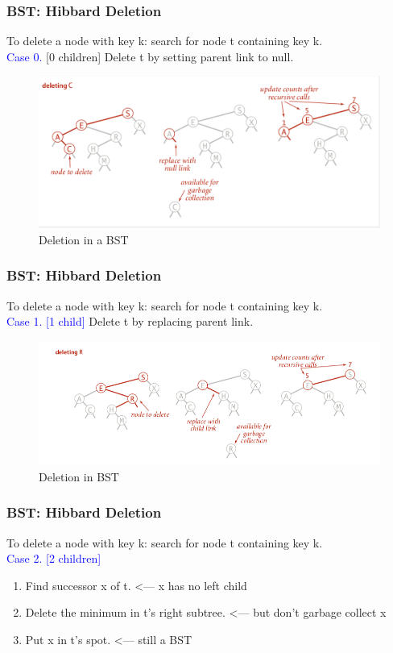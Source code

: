 \documentclass[11pt]{beamer}
\begin{document}
   \begin{frame}
   	\frametitle{BST: Hibbard Deletion} 
   	To delete a node with key k: search for node t containing key k. \\
   	\textcolor{blue}{Case 0.} [0 children] Delete t by setting parent link to null.
   	\begin{figure}
   		\centering
   		\includegraphics[width=1\linewidth]{"Screenshot 2020-11-16 at 10.02.29 PM"}
   		\caption{Deletion in a BST}
   		\label{fig:screenshot-2020-11-16-at-10}
   	\end{figure}
   \end{frame}	

    \begin{frame}
   	\frametitle{BST: Hibbard Deletion} 
   	To delete a node with key k: search for node t containing key k.  \\
   	\textcolor{blue}{Case 1. [1 child]} Delete t by replacing parent link.
   \begin{figure}
   	\centering
   	\includegraphics[width=1.1\linewidth]{"Screenshot 2020-11-16 at 10.17.41 PM"}
   	\caption{Deletion in BST}
   	\label{fig:screenshot-2020-11-16-at-10}
   \end{figure}
   \end{frame}	

   \begin{frame}
  	\frametitle{BST: Hibbard Deletion} 
  	To delete a node with key k: search for node t containing key k. \\
  	\textcolor{blue}{Case 2. [2 children]} \\
  	\begin{enumerate}
  		\item Find successor x of t.  \alert{ <--- x has no left child}
  		\item Delete the minimum in t's right subtree.  \alert{ <---  but don't garbage collect x}
  		\item Put x in t's spot.  \alert{ <---  still a BST}
  	\end{enumerate}
  \end{frame}	
\end{document}
